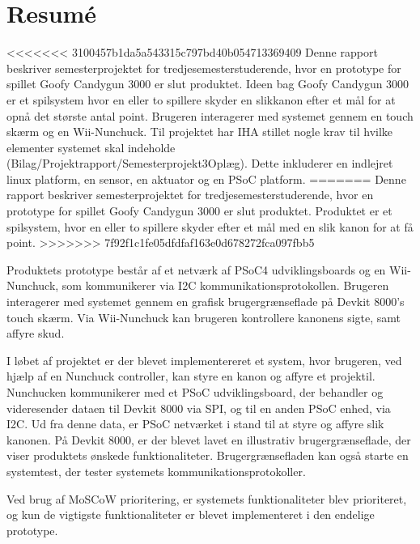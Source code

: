 \chapter{Resumé}
<<<<<<< 3100457b1da5a543315c797bd40b054713369409
Denne rapport beskriver semesterprojektet for tredjesemesterstuderende, hvor en prototype for spillet Goofy Candygun 3000 er slut produktet. Ideen bag Goofy Candygun 3000 er et spilsystem hvor en eller to spillere skyder en slikkanon efter et mål for at opnå det største antal point. Brugeren interagerer med systemet gennem en touch skærm og en Wii-Nunchuck. Til projektet har IHA stillet nogle krav til hvilke elementer systemet skal indeholde (Bilag/Projektrapport/Semesterprojekt3Oplæg). Dette inkluderer en indlejret linux platform, en sensor, en aktuator og en PSoC platform. \newline
=======
Denne rapport beskriver semesterprojektet for tredjesemesterstuderende, hvor en prototype for spillet Goofy Candygun 3000 er slut produktet. Produktet er et spilsystem, hvor en eller to spillere skyder efter et mål med en slik kanon for at få point.\newline
>>>>>>> 7f92f1c1fe05dfdfaf163e0d678272fca097fbb5

\noindent Produktets prototype består af et netværk af PSoC4 udviklingsboards og en Wii-Nunchuck, som kommunikerer via I2C kommunikationsprotokollen. Brugeren interagerer med systemet gennem en grafisk brugergrænseflade på Devkit 8000's touch skærm. Via Wii-Nunchuck kan brugeren kontrollere kanonens sigte, samt affyre skud. \newline

\noindent I løbet af projektet er der blevet implementereret et system, hvor brugeren, ved hjælp af en Nunchuck controller, kan styre en kanon og affyre et projektil. Nunchucken kommunikerer med et PSoC udviklingsboard, der behandler og videresender dataen til Devkit 8000 via SPI, og til en anden PSoC enhed, via I2C. Ud fra denne data, er PSoC netværket i stand til at styre og affyre slik kanonen. På Devkit 8000, er der blevet lavet en illustrativ brugergrænseflade, der viser produktets ønskede funktionaliteter. Brugergrænsefladen kan også starte en systemtest, der tester systemets kommunikationsprotokoller.\newline
 
\noindent Ved brug af MoSCoW prioritering, er systemets funktionaliteter blev prioriteret, og kun de vigtigste funktionaliteter er blevet implementeret i den endelige prototype. \newline

